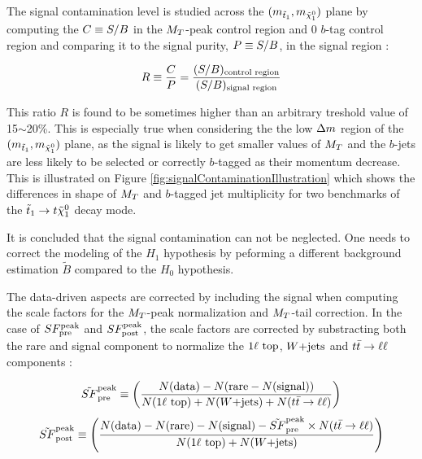         The signal contamination level is studied across the $(m_{\tilde{t}_1},m_{\tilde{\chi}_1^0})$
        plane by computing the $C \equiv S/B$ in the $M_T$-peak control region and 0 $b$-tag
        control region and comparing it to the signal purity, $P \equiv S/B$, in the signal region :

        \begin{equation}
            R \equiv \frac{C}{P} = \frac{(S/B)_\text{control region}}{(S/B)_\text{signal region}}
            \label{eq:contaminationRatio}
        \end{equation}
      
        This ratio $R$ is found to be sometimes higher than an arbitrary treshold value of 15$\sim$20\%.
        This is especially true when considering the the low $\Delta m$ region of the $(m_{\tilde{t}_1},
        m_{\tilde{\chi}_1^0})$ plane, as the signal is likely to get smaller values of $M_T$ and the $b$-jets
        are less likely to be selected or correctly $b$-tagged as their momentum decrease. This is illustrated
        on Figure \ref{fig:signalContaminationIllustration} which shows the differences in shape of $M_T$ and
        $b$-tagged jet multiplicity for two benchmarks of the $\tilde{t}_1 \rightarrow t \tilde{\chi}_1^0$ decay mode.
       
    
        It is concluded that the signal contamination can not be neglected. One needs to correct the modeling
        of the $H_1$ hypothesis by peforming a different background estimation $\tilde{B}$ compared to the 
        $H_0$ hypothesis.

        The data-driven aspects are corrected by including the signal when computing the scale factors for the
        $M_T$-peak normalization and $M_T$-tail correction. In the case of $SF_{\text{pre}}^{\text{peak}}$ and $SF_{\text{post}}^{\text{peak}}$, the scale factors
        are corrected by substracting both the rare and signal component to normalize the $1\ell~\text{top}$, $\text{$W$+jets}$
        and $t\bar{t} \rightarrow \ell \ell$ components :

        \begin{equation}
            \tilde{SF}_{\text{pre}}^{\text{peak}} \equiv \left( \frac{N(\text{data}) - N(\text{rare} - N(\text{signal}))}{N(1\ell~\text{top}) + N(\text{$W$+jets}) + N(t\bar{t} \rightarrow \ell \ell)} \right)
        \end{equation}
        \begin{equation}
            \tilde{SF}_{\text{post}}^{\text{peak}} \equiv \left( \frac{N(\text{data}) - N(\text{rare}) - N(\text{signal}) - \tilde{SF}_{\text{pre}}^{\text{peak}} \times N(t\bar{t} \rightarrow \ell \ell)}{N(1\ell~\text{top}) + N(\text{$W$+jets})} \right)
        \end{equation}

